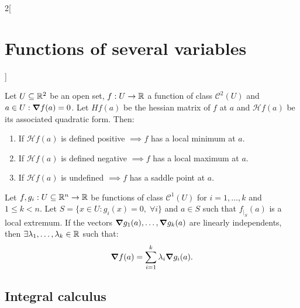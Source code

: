 \documentclass[../../../main.tex]{subfiles}
\begin{document}
\begin{multicols}{2}[\section{Functions of several variables}]
    \begin{theorem}
        Let $U\subseteq\mathbb{R}^2$ be an open set, $f:U\rightarrow\mathbb{R} $ a function of class $\mathcal{C}^2(U)$ and $a\in U:\grad f(a)=0$. Let $Hf(a)$ be the hessian matrix of $f$ at $a$ and $\mathcal{H}f(a)$ be its associated quadratic form. Then:
        \begin{enumerate}
            \item If $\mathcal{H}f(a)$ is defined positive $\implies f$ has a local minimum at $a$.
            \item If $\mathcal{H}f(a)$ is defined negative $\implies f$ has a local maximum at $a$.
            \item If $\mathcal{H}f(a)$ is undefined $\implies f$ has a saddle point at $a$.
        \end{enumerate}
    \end{theorem}
    \begin{theorem}
        Let $f,g_i:U\subseteq\mathbb{R}^n\rightarrow\mathbb{R} $ be functions of class $\mathcal{C}^1(U)$ for $i=1,\ldots,k$ and $1\leq k<n$. Let $S=\{x\in U:g_i(x)=0,\;\forall i\}$ and $a\in S$ such that $f_{|_S}(a)$ is a local extremum. If the vectors $\grad g_1(a),\ldots,\grad g_k(a)$ are linearly independents, then $\exists\lambda_1,\ldots,\lambda_k\in\mathbb{R} $ such that: $$\grad f(a)=\sum_{i=1}^k\lambda_i\grad g_i(a).$$
    \end{theorem}
    \subsection{Integral calculus}

\end{multicols}
\end{document}
